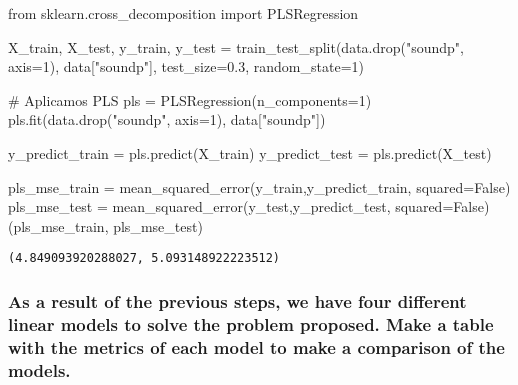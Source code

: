\documentclass[
  letterpaper,
  DIV=11,
  numbers=noendperiod]{scrartcl}
\newenvironment{Shaded}{\begin{snugshade}}{\end{snugshade}}
\newcommand{\CommentTok}[1]{\textcolor[rgb]{0.37,0.37,0.37}{#1}}
\newcommand{\DecValTok}[1]{\textcolor[rgb]{0.68,0.00,0.00}{#1}}
\newcommand{\FloatTok}[1]{\textcolor[rgb]{0.68,0.00,0.00}{#1}}
\newcommand{\ImportTok}[1]{\textcolor[rgb]{0.00,0.46,0.62}{#1}}
\newcommand{\NormalTok}[1]{\textcolor[rgb]{0.00,0.23,0.31}{#1}}
\newcommand{\OperatorTok}[1]{\textcolor[rgb]{0.37,0.37,0.37}{#1}}
\newcommand{\StringTok}[1]{\textcolor[rgb]{0.13,0.47,0.30}{#1}}
\newcommand{\VariableTok}[1]{\textcolor[rgb]{0.07,0.07,0.07}{#1}}
\begin{document}
\begin{Shaded}
\begin{Highlighting}[]
\ImportTok{from}\NormalTok{ sklearn.cross\_decomposition }\ImportTok{import}\NormalTok{ PLSRegression}

\NormalTok{X\_train, X\_test, y\_train, y\_test }\OperatorTok{=}\NormalTok{ train\_test\_split(data.drop(}\StringTok{"soundp"}\NormalTok{, axis}\OperatorTok{=}\DecValTok{1}\NormalTok{),}
\NormalTok{                                                    data[}\StringTok{"soundp"}\NormalTok{],}
\NormalTok{                                                    test\_size}\OperatorTok{=}\FloatTok{0.3}\NormalTok{, random\_state}\OperatorTok{=}\DecValTok{1}\NormalTok{)}

\CommentTok{\# Aplicamos PLS}
\NormalTok{pls }\OperatorTok{=}\NormalTok{ PLSRegression(n\_components}\OperatorTok{=}\DecValTok{1}\NormalTok{)}
\NormalTok{pls.fit(data.drop(}\StringTok{"soundp"}\NormalTok{, axis}\OperatorTok{=}\DecValTok{1}\NormalTok{), data[}\StringTok{"soundp"}\NormalTok{])}

\NormalTok{y\_predict\_train }\OperatorTok{=}\NormalTok{ pls.predict(X\_train)}
\NormalTok{y\_predict\_test }\OperatorTok{=}\NormalTok{ pls.predict(X\_test)}

\NormalTok{pls\_mse\_train }\OperatorTok{=}\NormalTok{ mean\_squared\_error(y\_train,y\_predict\_train, squared}\OperatorTok{=}\VariableTok{False}\NormalTok{)}
\NormalTok{pls\_mse\_test }\OperatorTok{=}\NormalTok{ mean\_squared\_error(y\_test,y\_predict\_test, squared}\OperatorTok{=}\VariableTok{False}\NormalTok{)}
\NormalTok{(pls\_mse\_train, pls\_mse\_test)}
\end{Highlighting}
\end{Shaded}

\begin{verbatim}
(4.849093920288027, 5.093148922223512)
\end{verbatim}

\hypertarget{as-a-result-of-the-previous-steps-we-have-four-different-linear-models-to-solve-the-problem-proposed.-make-a-table-with-the-metrics-of-each-model-to-make-a-comparison-of-the-models.}{%
\subsubsection{As a result of the previous steps, we have four different
linear models to solve the problem proposed. Make a table with the
metrics of each model to make a comparison of the
models.}\label{as-a-result-of-the-previous-steps-we-have-four-different-linear-models-to-solve-the-problem-proposed.-make-a-table-with-the-metrics-of-each-model-to-make-a-comparison-of-the-models.}}
\end{document}
